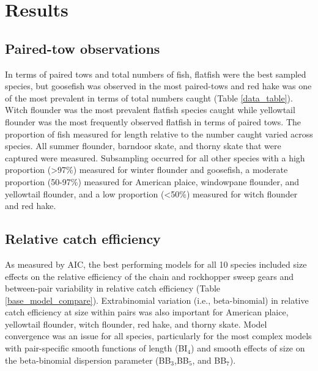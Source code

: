 \documentclass[
  12pt,
]{article}
\begin{document}
\hypertarget{results}{%
\section{Results}\label{results}}

\hypertarget{paired-tow-observations}{%
\subsection{Paired-tow observations}\label{paired-tow-observations}}

In terms of paired tows and total numbers of fish, flatfish were the
best sampled species, but goosefish was observed in the most paired-tows
and red hake was one of the most prevalent in terms of total numbers
caught (Table \ref{data_table}). Witch flounder was the most prevalent
flatfish species caught while yellowtail flounder was the most
frequently observed flatfish in terms of paired tows. The proportion of
fish measured for length relative to the number caught varied across
species. All summer flounder, barndoor skate, and thorny skate that were
captured were measured. Subsampling occurred for all other species with
a high proportion (\textgreater97\%) measured for winter flounder and
goosefish, a moderate proportion (50-97\%) measured for American plaice,
windowpane flounder, and yellowtail flounder, and a low proportion
(\textless50\%) measured for witch flounder and red hake.

\hypertarget{relative-catch-efficiency}{%
\subsection{Relative catch efficiency}\label{relative-catch-efficiency}}

As measured by AIC, the best performing models for all 10 species
included size effects on the relative efficiency of the chain and
rockhopper sweep gears and between-pair variability in relative catch
efficiency (Table \ref{base_model_compare}). Extrabinomial variation
(i.e., beta-binomial) in relative catch efficiency at size within pairs
was also important for American plaice, yellowtail flounder, witch
flounder, red hake, and thorny skate. Model convergence was an issue for
all species, particularly for the most complex models with pair-specific
smooth functions of length (BI\(_4\)) and smooth effects of size on the
beta-binomial dispersion parameter (BB\(_3\),BB\(_5\), and BB\(_7\)).
\end{document}
